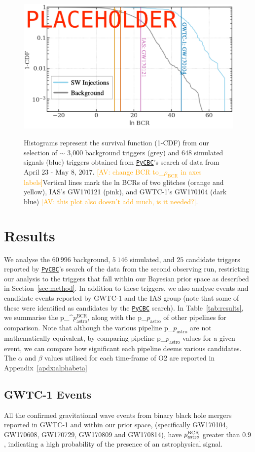 \documentclass[%
 nofootinbib,
 amsmath,amssymb,
 aps,
 twocolumn
]{revtex4-2}
\newcommand{\pycbc}{{\sc \href{https://pycbc.org/}{\texttt{PyCBC}}}\xspace}
\newcommand{\fancytext}[1]{{\relax\ifmmode#1\else $#1$\fi}\xspace}
\newcommand{\mathcmd}[1]{{\sc \relax\ifmmode#1\else $#1$\fi}\xspace}
\newcommand{\bcr}{\mathcmd{\rho_\text{BCR}}}
\newcommand{\pastro}{\fancytext{p_\text{astro}}}
\newcommand{\pastrobcr}{\fancytext{p_\text{astro}^{\text{BCR}}}}
\newcommand{\av}[1]{\textcolor{orange}{[AV: #1]}}
\begin{document}
\begin{figure}[!ht]
{\centering \includegraphics[width=0.75\linewidth]{images/bcr_cdf} }
\caption[BCR distribution example]{Histograms represent the survival function (1-CDF) from our selection of $\sim$ 3,000 background triggers (grey) and 648 simulated signals (blue) triggers obtained from \pycbc's search of data from $\text{April 23 - May 8, 2017}$. \av{change BCR to\bcr in axes labels}Vertical lines mark the ln BCRs of two glitches (orange and yellow), IAS's GW170121 (pink), and GWTC-1's GW170104 (dark blue) \av{this plot also doesn't add much, is it needed?}.}\label{fig:bcrCdf}
\end{figure}


\section{\label{sec:Results}Results}


We analyse the $60\ 996$ background, $5\ 146$ simulated, and $25$ candidate triggers reported by \pycbc's search of the data from the second observing run, restricting our analysis to the triggers that fall within our Bayesian prior space as described in Section~\ref{sec:method}. In addition to these triggers, we also analyse events and candidate events reported by GWTC-1 and the IAS group (note that some of these were identified as candidates by the \pycbc search). In Table~\ref{tab:results}, we summarise the \pastrobcr, along with the \pastro of other pipelines for comparison. Note that although the various pipeline \pastro are not mathematically equivalent, by comparing pipeline \pastro values for a given event, we can compare how significant each pipeline deems various candidates. The $\alpha$ and $\beta$ values utilised for each time-frame of O2 are reported in Appendix~\ref{apdx:alphabeta}


\subsection{GWTC-1 Events}
All the confirmed gravitational wave events from binary black hole mergers reported in GWTC-1 and within our prior space, (specifically GW170104, GW170608, GW170729, GW170809 and GW170814), have $\pastrobcr$ greater than $0.9$, indicating a high probability of the presence of an astrophysical signal. 
\end{document}
